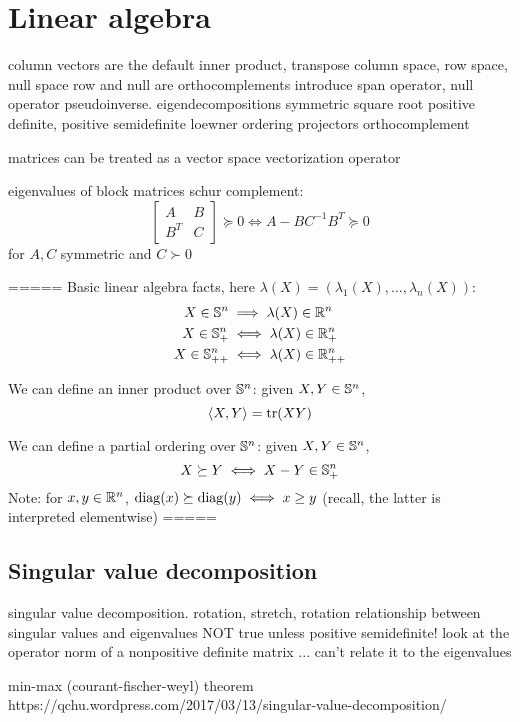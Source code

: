\chapter{Linear algebra}
\label{chap:linear_algebra}

column vectors are the default
inner product, transpose
column space, row space, null space
row and null are orthocomplements
introduce span operator, null operator
pseudoinverse. %
eigendecompositions
symmetric square root
positive definite, positive semidefinite
loewner ordering %
projectors
orthocomplement

matrices can be treated as a vector space 
vectorization operator

eigenvalues of block matrices
schur complement:
$$
\begin{bmatrix} A & B \\ B^T & C \end{bmatrix} \succeq 0
\iff A - BC^{-1} B^T \succeq 0
$$
for $A,C$ symmetric and $C \succ 0$

=====
Basic linear algebra facts, here
  $\lambda(X)=(\lambda_1(X),\ldots,\lambda_n(X))$: 
\begin{alignat*}{2}
X \in \mathbb{S}^n &\implies \lambda(X)\in \mathbb{R}^n \\
X \in \mathbb{S}^n_+ &\iff \lambda(X)\in \mathbb{R}^n_+ \\
X \in \mathbb{S}^n_{++} &\iff \lambda(X)\in \mathbb{R}^n_{++}
\end{alignat*}

We can define an inner product over $\mathbb{S}^n$: given $X,Y\in \mathbb{S}^n$,
$$
\langle X, Y \rangle = \operatorname{tr}(XY) 
$$

We can define a partial ordering over $\mathbb{S}^n$: 
  given $X,Y\in \mathbb{S}^n$, 
$$
X\succeq Y \iff X-Y \in \mathbb{S}^n_+
$$
Note: for $x,y \in \mathbb{R}^n$, $\operatorname{diag}(x) \succeq \operatorname{diag}(y) \iff x \geq y$
(recall, the latter is interpreted elementwise)
=====

\section{Singular value decomposition}
\label{sec:singular_value_decomposition}

singular value decomposition. rotation, stretch, rotation
relationship between singular values and eigenvalues
NOT true unless positive semidefinite! 
look at the operator norm of a nonpositive definite matrix ... can't relate it to the eigenvalues

min-max (courant-fischer-weyl) theorem
https://qchu.wordpress.com/2017/03/13/singular-value-decomposition/
